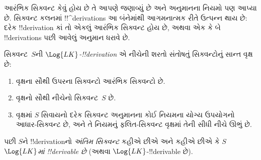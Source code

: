 \documentclass[../../../include/open-logic-section]{subfiles}
\begin{document}
      {}
      {}


\begin{explain}
આરંભિક સિક્વન્ટ કેવું હોય છે તે આપણે જણાવ્યું છે અને અનુમાનના નિયમો પણ
આપ્યા છે. સિક્વન્ટ કલનમાં !!^{derivation}s આ બંનેમાંથી આગમનાત્મક રીતે
ઉત્પન્ન થાય છે: દરેક !!{derivation} કાં તો એકલું આરંભિક સિક્વન્ટ હોય છે,
અથવા એક કે બે !!{derivation}s પછી આવેલું અનુમાન ધરાવે છે.
\end{explain}

\begin{defn}
સિક્વન્ટ~$S$ની \emph{$\Log{LK}$-!!{derivation}} એ નીચેની શરતો
સંતોષતું સિક્વન્ટોનું સાન્ત વૃક્ષ છે:
\begin{enumerate}
\item વૃક્ષના સૌથી ઉપરના સિક્વન્ટો આરંભિક સિક્વન્ટો છે.
\item વૃક્ષનો સૌથી નીચેનો સિક્વન્ટ~$S$ છે.
\item વૃક્ષમાં $S$ સિવાયનો દરેક સિક્વન્ટ અનુમાનના કોઈ નિયમના યોગ્ય
  ઉપયોગનો આધાર-સિક્વન્ટ છે, અને તે નિયમનું ફલિત-સિક્વન્ટ વૃક્ષમાં તેની
  સીધી નીચે ઊભું છે.
\end{enumerate}
પછી $S$ને !!{derivation}નો \emph{અંતિમ સિક્વન્ટ} કહીએ છીએ અને કહીએ છીએ
કે $S$ \emph{$\Log{LK}$માં !!{derivable} છે} (અથવા
$\Log{LK}$-!!{derivable} છે).
\end{defn}
\end{document}
